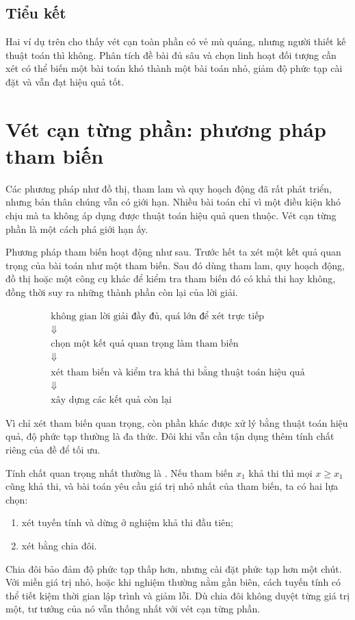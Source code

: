 \documentclass[11pt]{article}
\begin{document}
\subsection{Tiểu kết}

Hai ví dụ trên cho thấy vét cạn toàn phần có vẻ mù quáng, nhưng người thiết
kế thuật toán thì không. Phân tích đề bài đủ sâu và chọn linh hoạt đối tượng
cần xét có thể biến một bài toán khó thành một bài toán nhỏ, giảm độ phức tạp
cài đặt và vẫn đạt hiệu quả tốt.

\section{Vét cạn từng phần: phương pháp tham biến}

Các phương pháp như đồ thị, tham lam và quy hoạch động đã rất phát triển,
nhưng bản thân chúng vẫn có giới hạn. Nhiều bài toán chỉ vì một điều kiện
khó chịu mà ta không áp dụng được thuật toán hiệu quả quen thuộc. Vét cạn
từng phần là một cách phá giới hạn ấy.

Phương pháp tham biến hoạt động như sau. Trước hết ta xét một kết quả quan
trọng của bài toán như một tham biến. Sau đó dùng tham lam, quy hoạch động,
đồ thị hoặc một công cụ khác để kiểm tra tham biến đó có khả thi hay không,
đồng thời suy ra những thành phần còn lại của lời giải.

\[
\begin{array}{c}
\text{không gian lời giải đầy đủ, quá lớn để xét trực tiếp}\\[0.5em]
\Downarrow\\[0.5em]
\text{chọn một kết quả quan trọng làm tham biến}\\[0.5em]
\Downarrow\\[0.5em]
\text{xét tham biến và kiểm tra khả thi bằng thuật toán hiệu quả}\\[0.5em]
\Downarrow\\[0.5em]
\text{xây dựng các kết quả còn lại}
\end{array}
\]

Vì chỉ xét tham biến quan trọng, còn phần khác được xử lý bằng thuật toán
hiệu quả, độ phức tạp thường là đa thức. Đôi khi vẫn cần tận dụng thêm tính
chất riêng của đề để tối ưu.

Tính chất quan trọng nhất thường là . Nếu tham biến \(x_1\)
khả thi thì mọi \(x\ge x_1\) cũng khả thi, và bài toán yêu cầu giá trị nhỏ
nhất của tham biến, ta có hai lựa chọn:
\begin{enumerate}
  \item xét tuyến tính và dừng ở nghiệm khả thi đầu tiên;
  \item xét bằng chia đôi.
\end{enumerate}
Chia đôi bảo đảm độ phức tạp thấp hơn, nhưng cài đặt phức tạp hơn một chút.
Với miền giá trị nhỏ, hoặc khi nghiệm thường nằm gần biên, cách tuyến tính có
thể tiết kiệm thời gian lập trình và giảm lỗi. Dù chia đôi không duyệt từng
giá trị một, tư tưởng của nó vẫn thống nhất với vét cạn từng phần.
\end{document}
